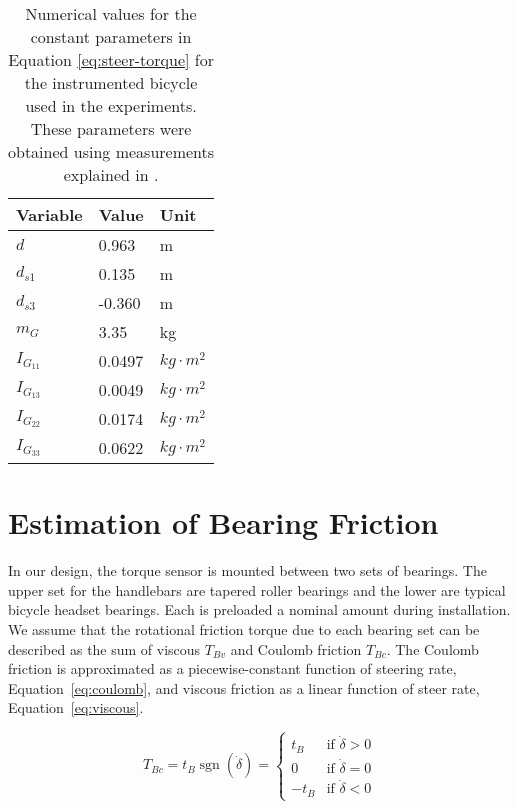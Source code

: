 \documentclass[10pt]{article}
\begin{document}
\begin{table}
  \centering
  \caption{Numerical values for the constant parameters in Equation
    \ref{eq:steer-torque} for the instrumented bicycle used in the experiments.
    These parameters were obtained using measurements explained in
    \cite{Moore2012}.}
  \begin{tabular}{lll}
    \toprule
    Variable     & Value  & Unit \\
    \midrule
    $d$          & 0.963  & m\\
    $d_{s1}$     & 0.135  & m \\
    $d_{s3}$     & -0.360 & m \\
    $m_G$        & 3.35   & kg \\
    $I_{G_{11}}$ & 0.0497 & $kg \cdot m^2$ \\
    $I_{G_{13}}$ & 0.0049 & $kg \cdot m^2$ \\
    $I_{G_{22}}$ & 0.0174 & $kg \cdot m^2$ \\
    $I_{G_{33}}$ & 0.0622 & $kg \cdot m^2$ \\
    \bottomrule
  \end{tabular}
  \label{tab:numerical-constants}
\end{table}

\section*{Estimation of Bearing Friction}
\label{sec:bearing-friction}

In our design, the torque sensor is mounted between two sets of bearings. The
upper set for the handlebars are tapered roller bearings and the lower are
typical bicycle headset bearings. Each is preloaded a nominal amount during
installation. We assume that the rotational friction torque due to each bearing set can be
described as the sum of viscous $T_{Bv}$ and Coulomb friction $T_{Bc}$. The
Coulomb friction is approximated as a piecewise-constant function of
steering rate, Equation~\ref{eq:coulomb}, and viscous friction as a linear
function of steer rate, Equation~\ref{eq:viscous}.

\begin{equation}
  T_{Bc} = t_B \operatorname{sgn}(\dot\delta) =
  \begin{cases}
    t_B  & \textrm{if $\dot{\delta}>0$}\\
    0    & \textrm{if $\dot{\delta}=0$}\\
    -t_B & \textrm{if $\dot{\delta}<0$}
  \end{cases}
  \label{eq:coulomb}
\end{equation}
\end{document}
